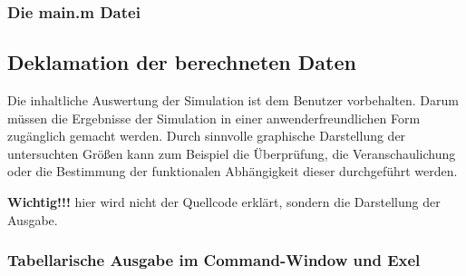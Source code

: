 \subsubsection{Die main.m Datei}
\subsection{Deklamation der berechneten Daten}

Die inhaltliche Auswertung der Simulation ist dem Benutzer vorbehalten. Darum müssen die Ergebnisse der Simulation in einer
anwenderfreundlichen Form zugänglich gemacht werden. Durch sinnvolle graphische Darstellung der untersuchten Größen kann zum
Beispiel die Überprüfung, die Veranschaulichung oder die Bestimmung der funktionalen Abhängigkeit dieser durchgeführt werden.


\textbf{Wichtig!!!} hier wird nicht der Quellcode erklärt, sondern die Darstellung der Ausgabe.
\subsubsection{Tabellarische Ausgabe im Command-Window und Exel}

